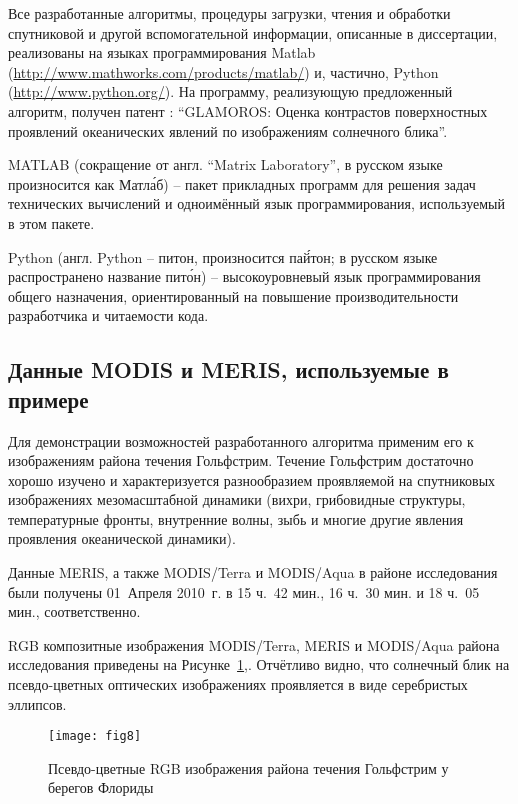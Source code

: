 Все разработанные алгоритмы, процедуры загрузки, чтения и обработки спутниковой и другой вспомогательной информации, описанные в диссертации, реализованы на языках программирования Matlab (\url{http://www.mathworks.com/products/matlab/}) и, частично, Python (\url{http://www.python.org/}). На программу, реализующую предложенный алгоритм, получен патент \citep{mag2011}: ``GLAMOROS: Оценка контрастов поверхностных проявлений океанических явлений по изображениям солнечного блика''.

MATLAB (сокращение от англ. ``Matrix Laboratory'', в русском языке произносится как Матл\'{а}б) -- пакет прикладных программ для решения задач технических вычислений и одноимённый язык программирования, используемый в этом пакете.

Python (англ. Python -- питон, произносится па\'{й}тон; в русском языке распространено название пит\'{о}н) -- высокоуровневый язык программирования общего назначения, ориентированный на повышение производительности разработчика и читаемости кода.



\subsection{Данные MODIS и MERIS, используемые в примере}

Для демонстрации возможностей разработанного алгоритма применим его к изображениям района течения Гольфстрим. Течение Гольфстрим достаточно хорошо изучено и характеризуется разнообразием проявляемой на спутниковых изображениях мезомасштабной динамики (вихри, грибовидные структуры, температурные фронты, внутренние волны, зыбь и многие другие явления проявления океанической динамики).

Данные MERIS, а также MODIS/Terra и MODIS/Aqua в районе исследования были получены 01~Апреля 2010~г. в 15 ч.~42 мин., 16 ч.~30 мин. и 18 ч.~05 мин., соответственно.

RGB композитные изображения MODIS/Terra, MERIS и MODIS/Aqua района исследования приведены на Рисунке~\ref{fig:8},. Отчётливо видно, что солнечный блик на псевдо-цветных оптических изображениях проявляется в виде серебристых эллипсов.



\begin{figure}[!thb]
    \texttt{[image: fig8]}
    \caption{Псевдо-цветные RGB изображения района течения Гольфстрим у берегов Флориды}
    \label{fig:8}
\end{figure}




